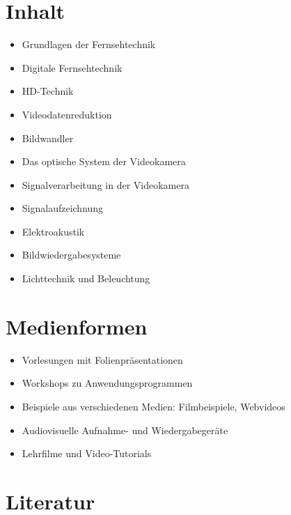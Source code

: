 \hypertarget{inhaltpathlabelmi-2017modulbeschreibungen-bachelorba_vc-audiovisuelle-medientechnik}{%
\section*{Inhalt\label{/mi-2017/modulbeschreibungen-bachelor/BA_VC-audiovisuelle-medientechnik}}\label{inhaltpathlabelmi-2017modulbeschreibungen-bachelorba_vc-audiovisuelle-medientechnik}}

\begin{itemize}
\tightlist
\item
  Grundlagen der Fernsehtechnik
\item
  Digitale Fernsehtechnik
\item
  HD-Technik
\item
  Videodatenreduktion
\item
  Bildwandler
\item
  Das optische System der Videokamera
\item
  Signalverarbeitung in der Videokamera
\item
  Signalaufzeichnung
\item
  Elektroakustik
\item
  Bildwiedergabesysteme
\item
  Lichttechnik und Beleuchtung
\end{itemize}

\hypertarget{medienformenpathlabelmi-2017modulbeschreibungen-bachelorba_vc-audiovisuelle-medientechnik}{%
\section*{Medienformen\label{/mi-2017/modulbeschreibungen-bachelor/BA_VC-audiovisuelle-medientechnik}}\label{medienformenpathlabelmi-2017modulbeschreibungen-bachelorba_vc-audiovisuelle-medientechnik}}

\begin{itemize}
\tightlist
\item
  Vorlesungen mit Folienpräsentationen
\item
  Workshops zu Anwendungsprogrammen
\item
  Beispiele aus verschiedenen Medien: Filmbeispiele, Webvideos
\item
  Audiovisuelle Aufnahme- und Wiedergabegeräte
\item
  Lehrfilme und Video-Tutorials
\end{itemize}

\hypertarget{literaturpathlabelmi-2017modulbeschreibungen-bachelorba_vc-audiovisuelle-medientechnik}{%
\section*{Literatur\label{/mi-2017/modulbeschreibungen-bachelor/BA_VC-audiovisuelle-medientechnik}}\label{literaturpathlabelmi-2017modulbeschreibungen-bachelorba_vc-audiovisuelle-medientechnik}}

